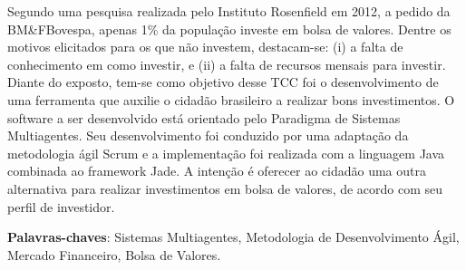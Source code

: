 \begin{resumo}[Resumo]
 


 \vspace{\onelineskip}
    Segundo uma pesquisa realizada pelo Instituto Rosenfield em 2012, a pedido da BM\&FBovespa, apenas 1\% da população investe em bolsa de valores. Dentre os motivos elicitados para os que não investem, destacam-se: (i) a falta de conhecimento em como investir, e (ii) a falta de recursos mensais para investir. Diante do exposto, tem-se como objetivo desse TCC foi o desenvolvimento de uma ferramenta que auxilie o cidadão brasileiro a realizar bons investimentos. O software a ser desenvolvido está orientado pelo Paradigma de Sistemas Multiagentes. Seu desenvolvimento foi conduzido por uma adaptação da metodologia ágil Scrum e a implementação foi realizada com a linguagem Java combinada ao framework Jade. A intenção é oferecer ao cidadão uma outra alternativa para realizar investimentos em bolsa de valores, de acordo com seu perfil de investidor.

    
 \noindent
 \textbf{Palavras-chaves}: Sistemas Multiagentes, Metodologia de Desenvolvimento Ágil, Mercado Financeiro, Bolsa de Valores.
\end{resumo}

